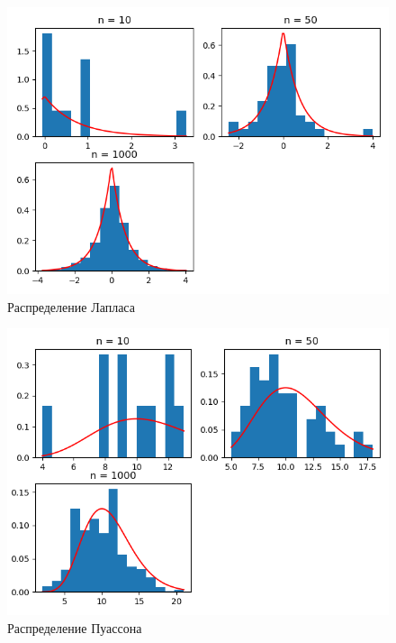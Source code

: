 \documentclass[a4]{article}
\begin{document}
\begin{center}
\begin{figure}
				\end{figure}
				\newpage
				\begin{figure}
					\includegraphics[width=\textwidth]{laplace1.png}
					\caption[Распределение Лапласа]{Распределение Лапласа}
				\end{figure}
				\newpage
				\begin{figure}
					\includegraphics[width=\textwidth]{poisson1.png}
					\caption[Распределение Пуассона]{Распределение Пуассона}
				\end{figure}
				\newpage
				\begin{figure}

\end{figure}
\end{center}
\end{document}
